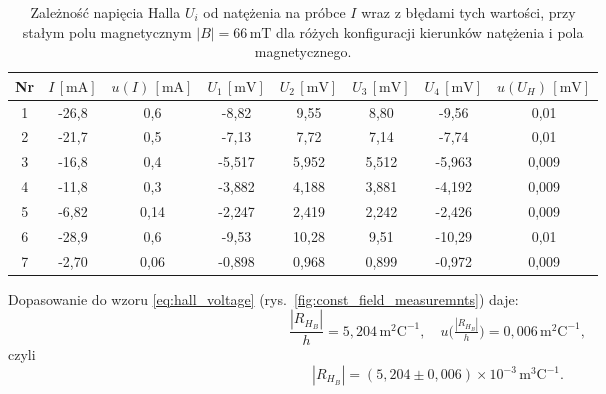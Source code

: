 \documentclass[12pt]{article}
\begin{document}
\begin{table}[H]
    \centering
    \begin{tabular}{c|cc|ccccc}
        \toprule
        Nr & $I\,[\mathrm{mA}]$ & $u(I)\,[\mathrm{mA}]$ & $U_1\,[\mathrm{mV}]$ & $U_2\,[\mathrm{mV}]$ & $U_3\,[\mathrm{mV}]$ & $U_4\,[\mathrm{mV}]$ & $u(U_H)\,[\mathrm{mV}]$ \\
        \midrule
        1 & -26{,}8 & 0{,}6 & -8{,}82 & 9{,}55 & 8{,}80 & -9{,}56 & 0{,}01 \\
        2 & -21{,}7 & 0{,}5 & -7{,}13 & 7{,}72 & 7{,}14 & -7{,}74 & 0{,}01 \\
        3 & -16{,}8 & 0{,}4 & -5{,}517 & 5{,}952 & 5{,}512 & -5{,}963 & 0{,}009 \\
        4 & -11{,}8 & 0{,}3 & -3{,}882 & 4{,}188 & 3{,}881 & -4{,}192 & 0{,}009 \\
        5 & -6{,}82 & 0{,}14 & -2{,}247 & 2{,}419 & 2{,}242 & -2{,}426 & 0{,}009 \\
        6 & -28{,}9 & 0{,}6 & -9{,}53 & 10{,}28 & 9{,}51 & -10{,}29 & 0{,}01 \\
        7 & -2{,}70 & 0{,}06 & -0{,}898 & 0{,}968 & 0{,}899 & -0{,}972 & 0{,}009 \\
        \bottomrule
    \end{tabular}
    \caption{Zależność napięcia Halla $U_i$ od natężenia na próbce $I$ wraz z błędami tych wartości, przy stałym polu magnetycznym $|B|=66\,\mathrm{mT}$ dla różych konfiguracji kierunków natężenia i pola magnetycznego.}
    \label{tab:const_magnetic_field_measurements}
\end{table}

Dopasowanie do wzoru \ref{eq:hall_voltage} (rys.~\ref{fig:const_field_measuremnts}) daje:
\[
    \frac{|R_{H_B}|}{h} = 5{,}204\,\mathrm{m}^2\mathrm{C}^{-1}, \quad u\bigl(\tfrac{|R_{H_B}|}{h}\bigr) = 0{,}006\,\mathrm{m}^2\mathrm{C}^{-1},
\]
czyli
\begin{equation}
    |R_{H_B}| = (5{,}204 \pm 0{,}006)\times 10^{-3}\,\mathrm{m}^3\mathrm{C}^{-1}.
    \label{eq:hall_constant_field}
\end{equation}
\end{document}
